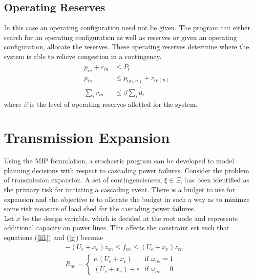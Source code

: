 \subsection{Operating Reserves}
In this case an operating configuration need not be given.  The program can either search for an operating configuration as well as reserves or given an operating configuration, allocate the reserves.  These operating reserves determine where the system is able to relieve congestion in a contingency.
\begin{align}
p_{in} + r_{in} &\le \overline{P}_i \\
p_{in} &\le p_{i\rho (n)} + r_{i\rho (n)} \\
\sum_i r_{in} &\le \beta \sum_i \hat{d}_i 
\end{align}
where $\beta$ is the level of operating reserves allotted for the system.

\section{Transmission Expansion}
Using the MIP formulation, a stochastic program can be developed to model planning decisions with respect to cascading power failures.  Consider the problem of transmission expansion.  A set of contingenciences, $\xi \in \Xi$, has been identified as the primary risk for initiating a cascading event.  There is a budget to use for expansion and the objective is to allocate the budget in such a way as to minimze some risk measure of load shed for the cascading power failures. \\

Let $x$ be the design variable, which is decided at the root node and represents additional capacity on power lines.  This affects the constraint set such that equations (\ref{lf1}) and (\ref{r}) become  
\begin{align}
-(U_{e}+x_e) z_{en} \le f_{en} \le (U_{e}+x_e) z_{en} &	\label{lfm}	\\
 R_{ne} = 
 \left\{ 
	\begin{array}{lr}
				\alpha (U_e + x_e) & \mbox{if } \omega_{ne}=1\\
			  (U_e + x_e) + \epsilon & \mbox{if } \omega_{ne}=0
	\end{array}
 \right. \label{rm}
\end{align}





